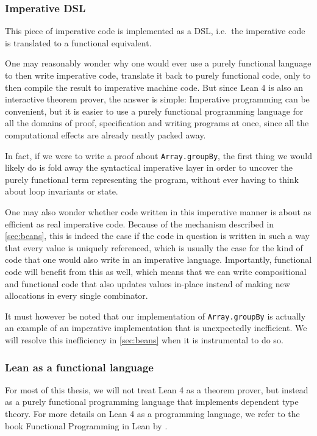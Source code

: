 \subsubsection{Imperative DSL}
This piece of imperative code is implemented as a DSL, i.e.\ the imperative code is translated to a functional equivalent.

One may reasonably wonder why one would ever use a purely functional language to then write imperative code, translate it back to purely functional code, only to then compile the result to imperative machine code. But since Lean 4 is also an interactive theorem prover, the answer is simple: Imperative programming can be convenient, but it is easier to use a purely functional programming language for all the domains of proof, specification and writing programs at once, since all the computational effects are already neatly packed away. 

In fact, if we were to write a proof about \lstinline|Array.groupBy|, the first thing we would likely do is fold away the syntactical imperative layer in order to uncover the purely functional term representing the program, without ever having to think about loop invariants or state.

One may also wonder whether code written in this imperative manner is about as efficient as real imperative code. Because of the mechanism described in \cref{sec:beans}, this is indeed the case if the code in question is written in such a way that every value is uniquely referenced, which is usually the case for the kind of code that one would also write in an imperative language. Importantly, functional code will benefit from this as well, which means that we can write compositional and functional code that also updates values in-place instead of making new allocations in every single combinator. 

It must however be noted that our implementation of \lstinline|Array.groupBy| is actually an example of an imperative implementation that is unexpectedly inefficient. We will resolve this inefficiency in \cref{sec:beans} when it is instrumental to do so.

\subsubsection{Lean as a functional language}

For most of this thesis, we will not treat Lean 4 as a theorem prover, but instead as a purely functional programming language that implements dependent type theory. For more details on Lean 4 as a programming language, we refer to the book Functional Programming in Lean by \cite{christiansen_functional_2023}.

